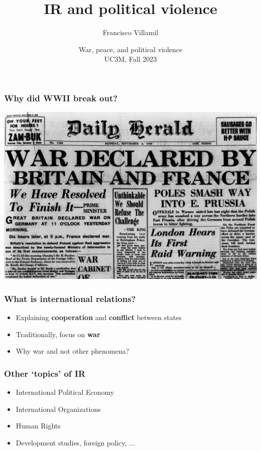 \documentclass[aspectratio=43]{beamer}
\title{\huge IR and political violence}
\author{Francisco Villamil}
\date{War, peace, and political violence\\UC3M, Fall 2023}
\begin{document}
\begin{frame}
  \titlepage
\end{frame}

\begin{frame}
\frametitle{Why did WWII break out?}
\centering

\includegraphics[width = \textwidth]{img/outbreak_wwii}

\end{frame}

\begin{frame}
\frametitle{What is international relations?}
\centering

\begin{itemize}
  \item Explaining \textbf{cooperation} and \textbf{conflict} between states
  \item Traditionally, focus on \textbf{war}
  \item Why war and not other phenomena?
\end{itemize}

\end{frame}

\begin{frame}
\frametitle{Other `topics' of IR}
\centering

\begin{itemize}[<+->]
  \item International Political Economy
  \item International Organizations
  \item Human Rights
  \item Development studies, foreign policy, ...
\end{itemize}

\end{frame}
\end{document}
